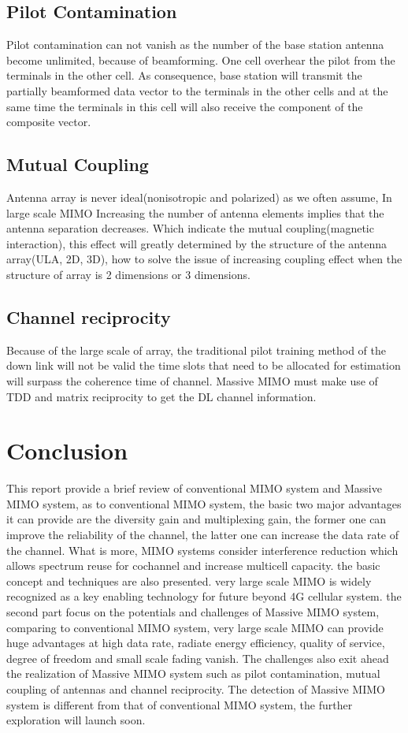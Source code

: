 \documentclass[conference]{IEEEtran}
\begin{document}
\subsection{Pilot Contamination}
Pilot contamination can not vanish as the number of the base station antenna become unlimited, because of beamforming. One cell overhear the pilot from the terminals in the other cell. As consequence, base station will transmit the partially beamformed data vector to the terminals in the other cells and at the same time the terminals in this cell will also receive the component of the composite vector.
\subsection{Mutual Coupling}
Antenna array is never ideal(nonisotropic and polarized) as we often assume,  In large scale MIMO Increasing the number of antenna elements implies that the antenna separation decreases. Which indicate the mutual coupling(magnetic interaction), this effect will greatly determined by the structure of the antenna array(ULA, 2D, 3D), how to solve the issue of increasing coupling effect when the structure of array is 2 dimensions or 3 dimensions. 
\subsection{Channel reciprocity}
Because of the large scale of array, the traditional pilot training method of the down link will not be valid the time slots that need to be allocated for estimation will surpass the coherence time of channel. Massive MIMO must make use of TDD and matrix reciprocity to get the DL channel information.
\section{Conclusion}
This report provide a brief review of conventional MIMO system and Massive MIMO system, as to conventional MIMO system, the basic two major advantages it can provide are the diversity gain and multiplexing gain, the former one can improve the reliability of the channel, the latter one can increase the data rate of the channel. What is more, MIMO systems consider interference reduction which allows spectrum reuse for cochannel and increase multicell capacity. the basic concept and techniques are also presented.\newline
very large scale MIMO is widely recognized as a key enabling technology for future beyond 4G cellular system. the second part focus on the potentials and challenges of Massive MIMO system, comparing to conventional MIMO system, very large scale MIMO can provide huge advantages at high data rate, radiate energy efficiency, quality of service, degree of freedom and small scale fading vanish. The challenges also exit ahead the realization of Massive MIMO system such as pilot contamination, mutual coupling of antennas and channel reciprocity. The detection of Massive MIMO system is different from that of conventional MIMO system, the further exploration will launch soon.
\newpage


\end{document}
